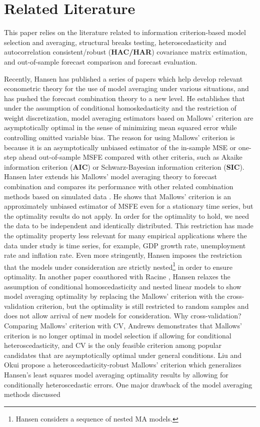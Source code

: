 \section{Related Literature}
This paper relies on the literature related to information criterion-based model selection and averaging, structural breaks testing, heteroscedasticity and autocorrelation consistent/robust (\textbf{HAC/HAR}) covariance matrix estimation, and out-of-sample forecast comparison and forecast evaluation.

Recently, Hansen has published a series of papers \cite{hansen_EMETRICA2007} \cite{hansen_JE2008} \cite{hansen2009averaging} \cite{hansen2011jackknife} which help develop relevant econometric theory for the use of model averaging under various situations, and has pushed the forecast combination theory to a new level. He establishes that under the assumption of conditional homoskedasticity and the restriction of weight discretization, model averaging estimators based on Mallows' criterion are asymptotically optimal in the sense of minimizing mean squared error while controlling omitted variable bias. The reason for using Mallows' criterion is because it is an asymptotically unbiased estimator of the in-sample MSE or one-step ahead out-of-sample MSFE compared with other criteria, such as Akaike information criterion (\textbf{AIC}) or Schwarz-Bayesian information criterion (\textbf{SIC}). Hansen later extends his Mallows' model averaging theory to forecast combination and compares its performance with other related combination methods based on simulated data \cite{hansen_JE2008}. He shows that Mallows' criterion is an approximately unbiased estimator of MSFE even for a stationary time series, but the optimality results do not apply. In order for the optimality to hold, we need the data to be independent and identically distributed. This restriction has made the optimality property less relevant for many empirical applications where the data under study is time series, for example, GDP growth rate, unemployment rate and inflation rate. Even more stringently, Hansen imposes the restriction that the models under consideration are strictly nested\footnote{Hansen considers a sequence of nested MA models.} in order to ensure optimality. In another paper coauthored with Racine \cite{hansen2011jackknife}, Hansen relaxes the assumption of conditional homoscedasticity and nested linear models to show model averaging optimality by replacing the Mallows' criterion with the cross-validation criterion, but the optimality is still restricted to random samples and does not allow arrival of new models for consideration. Why cross-validation? Comparing Mallows' criterion with CV, Andrews \cite{andrews_JE1991} demonstrates that Mallows' criterion is no longer optimal in model selection if allowing for conditional heteroscedasticity, and CV is the only feasible criterion among popular candidates that are asymptotically optimal under general conditions. Liu and Okui \cite{liu_okui2012} propose a heteroscedasticity-robust Mallows' criterion which generalizes Hansen's least squares model averaging optimality results by allowing for conditionally heteroscedastic errors. One major drawback of the model averaging methods discussed 